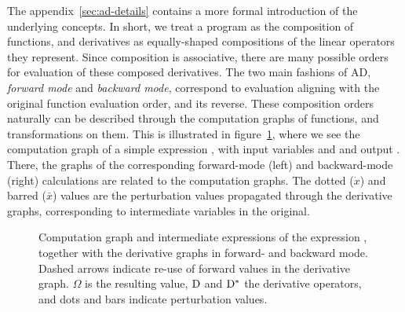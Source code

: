 The appendix~\ref{sec:ad-details} contains a more formal introduction of the underlying concepts.
In short, we treat a program as the composition of functions, and derivatives as equally-shaped
compositions of the linear operators they represent.  Since composition is associative, there are
many possible orders for evaluation of these composed derivatives.  The two main fashions of AD,
\emph{forward mode} and \emph{backward mode}, correspond to evaluation aligning with the original
function evaluation order, and its reverse.  These composition orders naturally can be described
through the computation graphs of functions, and transformations on them.  This is illustrated in
figure~\ref{fig:comp-graph}, where we see the computation graph of a simple expression
, with input variables  and  and output .  There, the
graphs of the corresponding forward-mode (left) and backward-mode (right) calculations are related
to the computation graphs.  The dotted (\(\dot{x}\)) and barred (\(\bar{x}\)) values are the
perturbation values propagated through the derivative graphs, corresponding to intermediate
variables in the original.

\begin{figure}[t]
  \centering
  \qquad
  \caption{Computation graph and intermediate expressions of the expression \protect{}, together with the derivative graphs in forward- and backward mode.  Dashed arrows
    indicate re-use of forward values in the derivative graph.  \(\Omega\) is the resulting value,
    \(\mathop{}\!\mathrm{D}\) and \(\mathop{}\!\mathrm{D}^{*}\) the derivative operators, and dots and bars indicate perturbation
    values.}
  \label{fig:comp-graph}
\end{figure}

